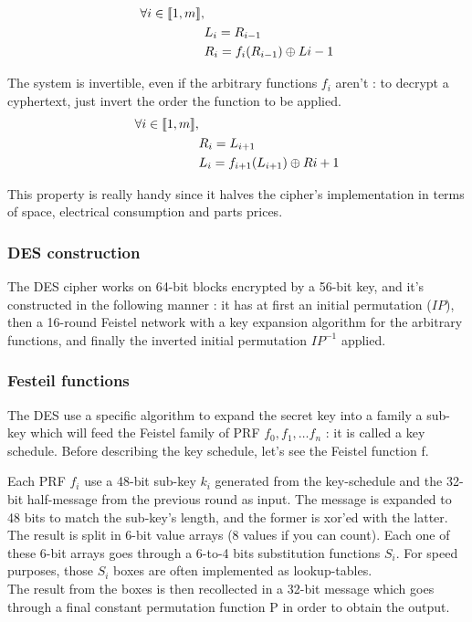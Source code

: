 \begin{mytheorem}
    \begin{align}
        \forall i \in \llbracket1,m\rrbracket,&                 \\
        &L_i = R_{i-1}                                          \\
        &R_i = f_i(R_{i-1}) \oplus L{i-1}                         
    \end{align}
\end{mytheorem}

The system is invertible, even if the arbitrary functions $f_i$ aren't : to decrypt a cyphertext, just invert the order the function to be applied. 
\begin{align}   
    \forall i \in \llbracket1,m\rrbracket,&                     \\
    &R_i = L_{i+1}                                              \\
    & L_i = f_{i+1}(L_{i+1}) \oplus R{i+1}                    
\end{align}

This property is really handy since it halves the cipher's implementation in terms of space, electrical consumption and parts prices.

\subsubsection{ DES construction }

The DES cipher works on 64-bit blocks encrypted by a 56-bit key, and it's constructed in the following manner : it has at first an initial permutation ($IP$), then a 16-round Feistel network with a key expansion algorithm for the arbitrary functions, and finally the inverted initial permutation $IP^{-1}$ applied.

\subsubsection{Festeil functions}

The DES use a specific algorithm to expand the secret key into a family a sub-key which will feed the Feistel family of PRF $f_0,f_1,\dots f_n$ : it is called a key schedule. Before describing the key schedule, let's see the Feistel function f. 

Each PRF $f_i$ use a 48-bit sub-key $k_i$ generated from the key-schedule and the 32-bit half-message from the previous round as input. The message is expanded to 48 bits to match the sub-key's length, and the former is xor'ed with the latter.\\
The result is split in 6-bit value arrays (8 values if you can count). Each one of these 6-bit arrays goes through a 6-to-4 bits substitution functions $S_i$. For speed purposes, those $S_i$ boxes are often implemented as lookup-tables. \\
The result from the boxes is then recollected in a 32-bit message which goes through a final constant permutation function P in order to obtain the output. \\

